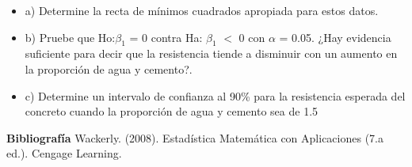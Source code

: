 \documentclass{../oxmathproblems}
\begin{document}
\begin{questions}
\begin{itemize}
  \item a) Determine la recta de mínimos cuadrados apropiada para estos datos.
  \item b) Pruebe que Ho:$\beta_1$ = 0 contra Ha:  $\beta_1$ $<$ 0 con $\alpha$ = 0.05. ¿Hay evidencia suficiente para decir que la resistencia tiende a disminuir con un aumento en  la proporción de agua y cemento?. 
\item c) Determine un intervalo de confianza al 90\% para la resistencia esperada del concreto cuando la proporción de agua y cemento sea de 1.5
\end{itemize}


\textbf{Bibliografía}
Wackerly. (2008). Estadística Matemática con Aplicaciones (7.a ed.). Cengage Learning.


\end{questions}
\end{document}
